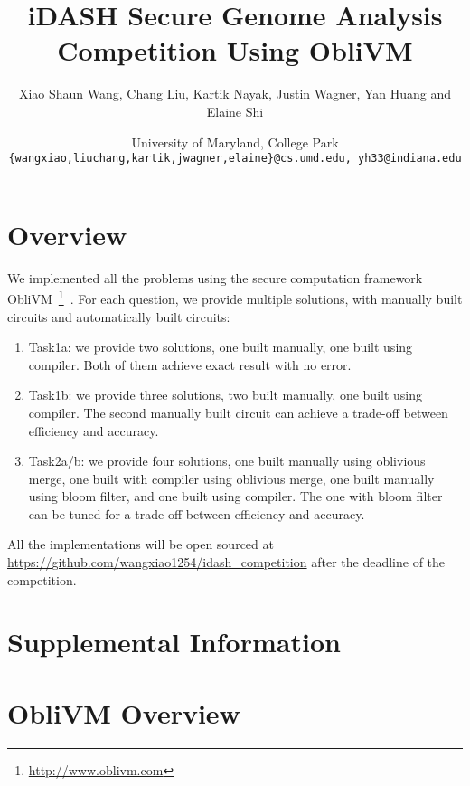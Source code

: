 \documentclass[11pt]{article}
\title{iDASH Secure Genome Analysis Competition Using {\sf ObliVM}}
\author{Xiao Shaun Wang, Chang Liu, Kartik Nayak, Justin Wagner, Yan Huang and Elaine Shi}
\date{University of Maryland, College Park\\
{\tt \{wangxiao,liuchang,kartik,jwagner,elaine\}@cs.umd.edu, yh33@indiana.edu}}
\begin{document}
\maketitle
\section{Overview}
We implemented all the problems using the secure computation framework {\sf ObliVM}~\footnote{\url{http://www.oblivm.com}}~\cite{oblivm}.
For each question, we provide multiple solutions, with manually built circuits and automatically built circuits:
\begin{enumerate}
\item Task1a: we provide two solutions, one built manually, one built using compiler. Both of them achieve exact result with no error.
\item Task1b: we provide three solutions, two built manually, one built using compiler. The second manually built circuit can achieve a trade-off between efficiency and accuracy.
\item Task2a/b: we provide four solutions, one built manually using oblivious merge, one built with compiler using oblivious merge, one built manually using bloom filter, and one built using compiler. The one with bloom filter can be tuned for a trade-off between efficiency and accuracy.
\end{enumerate}

All the implementations will be open sourced at \url{https://github.com/wangxiao1254/idash_competition} after the deadline of the competition.



\appendix

\section*{Supplemental Information}
\section{{\sf ObliVM} Overview}
\end{document}

